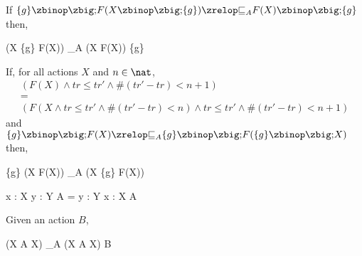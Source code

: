\begin{law}
  \label{rec-assump-distr-law}
  If $\{g\} \circseq F(X \circseq \{g\}) \circrefines_A F(X) \circseq \{g\}$ then,
  \begin{circus}
    (\circmu X \circspot \{g\} \circseq F(X))
    \circrefines_A
    (\circmu X \circspot F(X)) \circseq \{g\}
  \end{circus}
\end{law}

\begin{law}
  \label{assump-rec-distl-law}
  If, for all actions $X$ and $n \in \nat$,
  \[\begin{array}{l}
      (F(X) \land tr \leq tr' \land \# (tr'-tr) < n + 1) \\
      {} = {} \\
      (F(X \land tr \leq tr' \land \# (tr'-tr) < n) \land tr \leq tr' \land \# (tr'-tr) < n + 1)
    \end{array}\]
  and $\{g\} \circseq F(X) \circrefines_A \{g\} \circseq F(\{g\} \circseq X)$ then,
  \begin{circus}
    \{g\} \circseq (\circmu X \circspot F(X))
    \circrefines_A
    (\circmu X \circspot \{g\} \circseq F(X))
  \end{circus}
\end{law}

\begin{law}
  \label{var-var-comm-law}
  \begin{circus}
    \circvar x : X \circspot \circvar y : Y \circspot A = \circvar y : Y \circspot \circvar x : X \circspot A
  \end{circus}
\end{law}

\begin{law}
  \label{rec-action-intro-law}
  Given an action $B$,
  \begin{circus}
    (\circmu X \circspot A \circseq X) \circrefines_A (\circmu X \circspot A \circseq X) \circseq B
  \end{circus}
\end{law}

